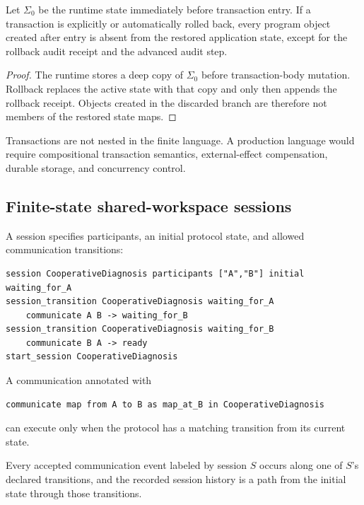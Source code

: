 \begin{proposition}
Let $\Sigma_0$ be the runtime state immediately before transaction entry.  If a
transaction is explicitly or automatically rolled back, every program object
created after entry is absent from the restored application state, except for
the rollback audit receipt and the advanced audit step.
\end{proposition}

\begin{proof}
The runtime stores a deep copy of $\Sigma_0$ before transaction-body mutation.
Rollback replaces the active state with that copy and only then appends the
rollback receipt.  Objects created in the discarded branch are therefore not
members of the restored state maps.
\end{proof}



Transactions are not nested in the finite language.  A production language
would require compositional transaction semantics, external-effect
compensation, durable storage, and concurrency control.

\subsection{Finite-state shared-workspace sessions}

A session specifies participants, an initial protocol state, and allowed
communication transitions:
\begin{lstlisting}[style=osl]
session CooperativeDiagnosis participants ["A","B"] initial waiting_for_A
session_transition CooperativeDiagnosis waiting_for_A
    communicate A B -> waiting_for_B
session_transition CooperativeDiagnosis waiting_for_B
    communicate B A -> ready
start_session CooperativeDiagnosis
\end{lstlisting}

A communication annotated with
\begin{lstlisting}[style=osl]
communicate map from A to B as map_at_B in CooperativeDiagnosis
\end{lstlisting}
can execute only when the protocol has a matching transition from its current
state.

\begin{theorem}
Every accepted communication event labeled by session $S$ occurs along one of
$S$'s declared transitions, and the recorded session history is a path from the
initial state through those transitions.
\end{theorem}

